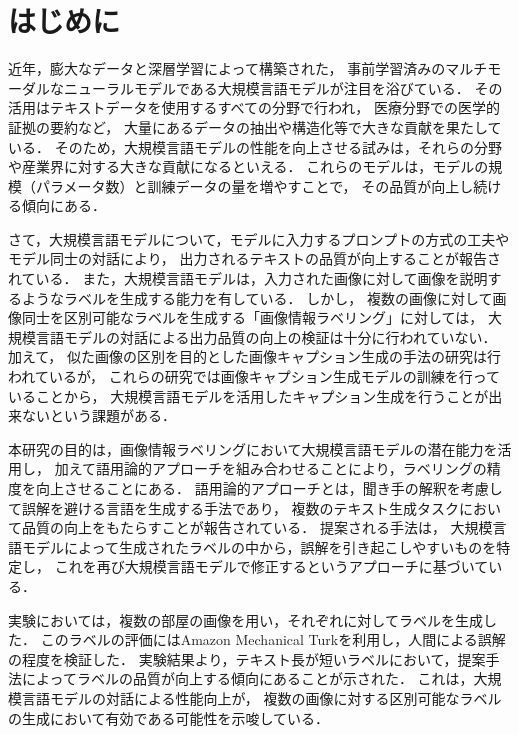\documentclass[a4paper,11pt]{jreport}
\begin{document}
\pagebreak \setcounter{page}{1}


\chapter{はじめに}

近年，膨大なデータと深層学習によって構築された，
事前学習済みのマルチモーダルなニューラルモデルである大規模言語モデルが注目を浴びている\cite{Yin2023}．
その活用はテキストデータを使用するすべての分野で行われ，
医療分野での医学的証拠の要約など，
大量にあるデータの抽出や構造化等で大きな貢献を果たしている\cite{Tang2023}．
そのため，大規模言語モデルの性能を向上させる試みは，それらの分野や産業界に対する大きな貢献になるといえる．
これらのモデルは，モデルの規模（パラメータ数）と訓練データの量を増やすことで，
その品質が向上し続ける傾向にある\cite{Devlin2019}．

さて，大規模言語モデルについて，モデルに入力するプロンプトの方式の工夫やモデル同士の対話により，
出力されるテキストの品質が向上することが報告されている\cite{Wei2022, Zhou2022, Madaan2023, Zheng2023,LiRuosen2023}．
また，大規模言語モデルは，入力された画像に対して画像を説明するようなラベルを生成する能力を有している．
しかし，
複数の画像に対して画像同士を区別可能なラベルを生成する「画像情報ラベリング」に対しては，
大規模言語モデルの対話による出力品質の向上の検証は十分に行われていない．
加えて，
似た画像の区別を目的とした画像キャプション生成の手法の研究は行われている\cite{Vedantam2017,Cohn-Gordon2018,Nie2020,Andreas2016}が，
これらの研究では画像キャプション生成モデルの訓練を行っていることから，
大規模言語モデルを活用したキャプション生成を行うことが出来ないという課題がある．

本研究の目的は，画像情報ラベリングにおいて大規模言語モデルの潜在能力を活用し，
加えて語用論的アプローチを組み合わせることにより，ラベリングの精度を向上させることにある．
語用論的アプローチとは，聞き手の解釈を考慮して誤解を避ける言語を生成する手法であり，
複数のテキスト生成タスクにおいて品質の向上をもたらすことが報告されている．
提案される手法は，
大規模言語モデルによって生成されたラベルの中から，誤解を引き起こしやすいものを特定し，
これを再び大規模言語モデルで修正するというアプローチに基づいている．

実験においては，複数の部屋の画像を用い，それぞれに対してラベルを生成した．
このラベルの評価にはAmazon Mechanical Turkを利用し，人間による誤解の程度を検証した．
実験結果より，テキスト長が短いラベルにおいて，提案手法によってラベルの品質が向上する傾向にあることが示された．
これは，大規模言語モデルの対話による性能向上が，
複数の画像に対する区別可能なラベルの生成において有効である可能性を示唆している．
\end{document}
